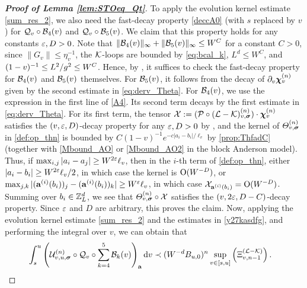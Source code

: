 \begin{proof}[\bf Proof of Lemma \ref{lem:STOeq_Qt}]
To apply the evolution kernel estimate \eqref{sum_res_2}, we also need the fast-decay property \eqref{deccA0} (with $s$ replaced by $v$) for ${\cal Q}_v\circ{\cal B}_4(v)$ and ${\cal Q}_v\circ{\cal B}_5(v)$. We claim that this property holds for any constants $\e,D>0$. Note that $\|{\cal B}_4(v)\|_\infty+\|{\cal B}_5(v)\|_\infty\le W^{C}$ for a constant $C>0$, since $\|G_v\|\le \eta_v^{-1}$, the $\cK$-loops are bounded by \eqref{eq:bcal_k}, $L^d\le W^{C}$, and $(1-v)^{-1}\le L^2/\ilambda^2\le W^{C}$. Hence, by , it suffices to check the fast-decay property for ${\cal B}_4(v)$ and ${\cal B}_5(v)$ themselves. For ${\cal B}_5(v)$, it follows from the decay of $\partial_v\dthn^{(n)}_v$ given by the second estimate in \eqref{eq:derv_Theta}. For ${\cal B}_4(v)$, we use the expression in the first line of \eqref{A4}. Its second term decays by the first estimate in \eqref{eq:derv_Theta}. For its first term, the tensor ${\cal X}:=({\cal P}\circ(\cL-\cK)^{(n)}_{v,\bsig})\cdot\dthn^{(n)}_v$ satisfies the $(v,\e,D)$-decay property for any $\e,D>0$ by , and the kernel of $\varTheta^{(n)}_{v,\bsig}$ in \eqref{def:op_thn} is bounded by $C(1-v)^{-1}e^{-c|a_i-b_i|/\ell_v}$ by \eqref{prop:ThfadC} (together with \eqref{Mbound_AO} or \eqref{Mbound_AO2} in the block Anderson model). Thus, if $\max_{i,j}|a_i-a_j|\ge W^{2\e}\ell_v$, then in the $i$-th term of \eqref{def:op_thn}, either $|a_i-b_i|\ge W^{2\e}\ell_v/2$, in which case the kernel is $\OO(W^{-D})$, or $\max_{j,k}|(\ba^{(i)}(b_i))_j-(\ba^{(i)}(b_i))_k|\ge W^{\e}\ell_v$, in which case ${\cal X}_{\ba^{(i)}(b_i)}=\OO(W^{-D})$. Summing over $b_i\in\Zn$, we see that $\varTheta^{(n)}_{v,\bsig}\circ{\cal X}$ satisfies the $(v,2\e,D-C)$-decay property. Since $\e$ and $D$ are arbitrary, this proves the claim. 
Now, applying the evolution kernel estimate \eqref{sum_res_2} and the estimates in \eqref{y27kasdfg}, and performing the integral over $v$, we can obtain that 
\begin{align}
&  \int_{s}^u \left(\mathcal{U}^{(n)}_{v, u, \bsig} \circ  {\cal Q}_v\circ \sum_{k=4}^5{\cal B}_k(v)  \right)_{\ba} \dd v  \prec  (W^{-d}B_{u,0})^n \sup_{v\in[s,u]}\left(\Xi^{({\cal L-\cal K})}_{v,n-1} \right). \label{eq:alternatecase2}
\end{align}


\end{proof}
